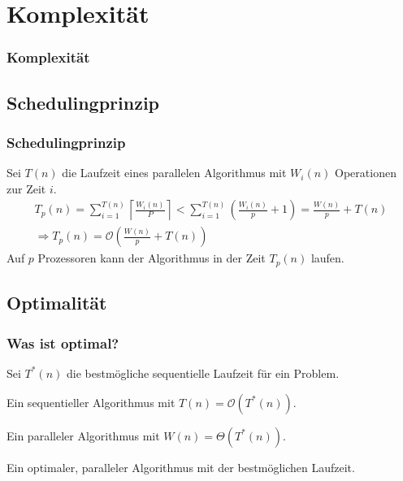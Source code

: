 \section{Komplexität}
\begin{frame}
    \frametitle{Komplexität}
    \tableofcontents[
        currentsection,
        hideothersubsections,
        sectionstyle=show/shaded,
    ]
\end{frame}

\subsection{Schedulingprinzip}
\begin{frame}
    \frametitle{Schedulingprinzip}
    Sei $T(n)$ die Laufzeit eines parallelen Algorithmus mit $W_i(n)$
    Operationen zur Zeit $i$.
    \begin{equation}
        \begin{gathered}
            T_p(n) = \sum_{i=1}^{T(n)} \left\lceil \frac{W_i(n)}{P} \right\rceil
            <
            \sum_{i=1}^{T(n)} \left( \frac{W_i(n)}{p} + 1 \right)
            = \frac{W(n)}{p} + T(n) \\
            \Rightarrow T_p(n) = \mathcal{O} \left( \frac{W(n)}{p} + T(n) \right)
        \end{gathered}
    \end{equation}
    Auf $p$ Prozessoren kann der Algorithmus in der Zeit $T_p(n)$ laufen.
\end{frame}

\subsection{Optimalität}
\begin{frame}
    \frametitle{Was ist optimal?}
    Sei $T^\ast(n)$ die bestmögliche sequentielle Laufzeit für ein Problem.
    \begin{definition}
        Ein sequentieller Algorithmus mit $T(n) = \mathcal{O}(T^\ast(n))$.
    \end{definition}
    \begin{definition}[optimal]
        Ein paralleler Algorithmus mit $W(n) = \Theta(T^\ast(n))$.
    \end{definition}
    \begin{definition}
        Ein optimaler, paralleler Algorithmus mit der bestmöglichen Laufzeit.
    \end{definition}
\end{frame}

